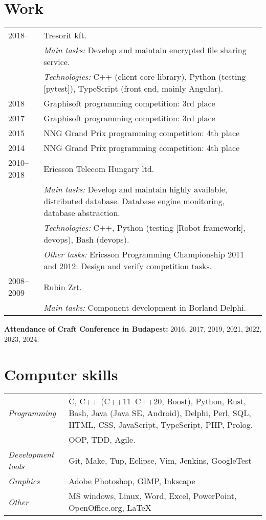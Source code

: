 \documentclass[a4paper,10pt]{article}
\newcommand{\pont}[1]{\emph{#1}}
\begin{document}
\section*{Work}
\begin{tabular}{lp{10cm}}
 2018--&Tresorit kft.\\
  &\emph{Main tasks:} Develop and maintain encrypted file sharing service.\\
  &\emph{Technologies:} C++ (client core library), Python (testing [pytest]), TypeScript (front end, mainly Angular).\\
 2018&Graphisoft programming competition: 3rd place\\
 2017&Graphisoft programming competition: 3rd place\\
 2015&NNG Grand Prix programming competition: 4th place\\
 2014&NNG Grand Prix programming competition: 4th place\\
 2010--2018&Ericsson Telecom Hungary ltd.\\
  &\emph{Main tasks:} Develop and maintain highly available, distributed database. Database engine monitoring, database abstraction.\\
  &\emph{Technologies:} C++, Python (testing [Robot framework], devops), Bash (devops).\\
  &\emph{Other tasks:} Ericsson Programming Championship 2011 and 2012: Design and verify competition tasks.\\
 2008--2009&Rubin Zrt.\\
  &\emph{Main tasks:} Component development in Borland Delphi.
\end{tabular}

\textbf{Attendance of Craft Conference in Budapest:} 2016, 2017, 2019, 2021, 2022, 2023, 2024.

\section*{Computer skills}
\begin{tabular}{lp{12cm}}
    \pont{Programming}&C, C++ (C++11--C++20, Boost), Python, Rust, Bash, Java (Java SE, Android), Delphi, Perl, SQL, HTML, CSS, JavaScript, TypeScript, PHP, Prolog.\\
 &OOP, TDD, Agile.\\
 \pont{Development tools}&Git, Make, Tup, Eclipse, Vim, Jenkins, GoogleTest\\
 \pont{Graphics}&Adobe Photoshop, GIMP, Inkscape\\
 \pont{Other}&MS windows, Linux, Word, Excel, PowerPoint, OpenOffice.org, LaTeX
\end{tabular}
\end{document}
